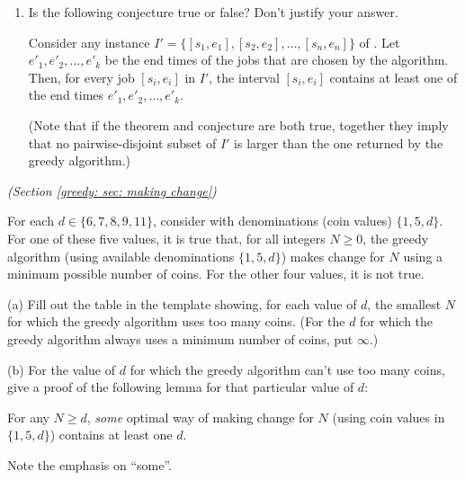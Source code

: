 \documentclass[11pt]{article}
\begin{document}
\begin{enumerate}[label=(\alph*)]
\item Is the following conjecture true or false?  Don't justify your answer.

  \begin{conjecture}
    Consider any instance $I'=\{[s_1, e_1],  [s_2, e_2], \ldots, [s_n, e_n]\}$ of .
    Let $e'_1, e'_2, \ldots, e'_k$ be the end times of the jobs that are chosen by the algorithm.
    Then, for every job $[s_i, e_i]$ in $I'$, the interval $[s_i, e_i]$ contains at least one of the end times
    $e'_1, e'_2, \ldots, e'_k$.
  \end{conjecture}  

  (Note that if the theorem and conjecture are both true,
  together they imply that no pairwise-disjoint subset of $I'$
  is larger than the one returned by the greedy algorithm.)
  
\end{enumerate}

\newpage

\setlength{\ITEMHT}{1.5in}
{
  \injectEnumerate 

}




\newpage
\problem\emph{(Section \ref{greedy: sec: making change})}
{\small
  For each $d\in\{6,7,8,9,11\}$, 
  consider  with denominations (coin values) $\{1, 5, d\}$.
  For one of these five values, 
  it is true that, for all integers $N\ge 0$, the greedy algorithm (using available denominations $\{1, 5, d\}$)
  makes change for $N$ using a minimum possible number of coins.
  For the other four values, it is not true.

  (a) Fill out the table in the template showing, for each value of $d$,
  the smallest $N$ for which the greedy algorithm uses too many coins.
  (For the $d$ for which the greedy algorithm always uses a minimum number of coins, put $\infty$.)

  (b) For the value of $d$ for which the greedy algorithm can't use too many coins,
  give a proof of the following lemma for that particular value of $d$:

  \begin{lemma}
    For any $N\ge d$, \emph{some} optimal way of making change for $N$ (using coin values in $\{1, 5, d\}$)
    contains at least one $d$.
  \end{lemma}

  Note the emphasis on ``some''.
}
\bigskip
\end{document}
